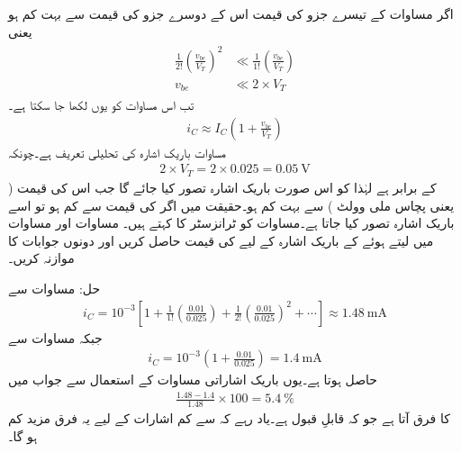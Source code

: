 اگر مساوات   کے تیسرے جزو کی قیمت اس کے دوسرے جزو کی قیمت سے بہت کم ہو یعنی
\begin{gather} \label{مساوات_ٹرانزسٹر_باریک_اشارہ_کی_تحلیلی_تعریف}
\begin{aligned}
\frac{1}{2!} \left(\frac{v_{be}}{V_T} \right )^2 & \ll \frac{1}{1!} \left(\frac{v_{be}}{V_T} \right )\\
v_{be}  & \ll 2 \times V_T
\end{aligned}
\end{gather}
تب اس مساوات کو یوں لکھا جا سکتا ہے۔
\begin{align} \label{مساوات_ٹرانزسٹر_کی_باریک_اشاراتی_مساوات}
i_C \approx I_C \left (1+\frac{v_{be}}{V_T} \right )
\end{align}
مساوات   باریک اشارہ  کی تحلیلی تعریف ہے۔چونکہ
\begin{align*}
2 \times V_T = 2 \times 0.025 =\SI{0.05}{\volt}
\end{align*}
کے برابر ہے لہٰذا  کو اس صورت باریک اشارہ تصور کیا جائے گا جب اس کی قیمت    ( یعنی پچاس ملی وولٹ ) سے بہت کم ہو۔حقیقت میں اگر   کی قیمت  سے کم ہو تو اسے باریک اشارہ تصور کیا جاتا ہے۔مساوات   کو ٹرانزسٹر کا  کہتے ہیں۔
مساوات   اور مساوات   میں   لیتے ہوئے  کے باریک اشارہ کے لیے  کی قیمت حاصل کریں اور دونوں جوابات کا موازنہ کریں۔

حل:	مساوات   سے
\begin{align*}
i_C=10^{-3} \left [1+\frac{1}{1!} \left(\frac{0.01}{0.025}\right)  +\frac{1}{2!} \left( \frac{0.01}{0.025} \right)^2   +\cdots \right ] \approx \SI{1.48}{\milli \ampere}
\end{align*}
جبکہ مساوات   سے
\begin{align*}
i_C=10^{-3} \left(1+\frac{0.01}{0.025} \right )=\SI{1.4}{\milli \ampere}
\end{align*}
حاصل ہوتا ہے۔یوں باریک اشاراتی مساوات کے استعمال سے جواب میں
\begin{align*}
\frac{1.48-1.4}{1.48} \times 100=\SI{5.4}{\percent}
\end{align*}
کا فرق آتا ہے جو کہ قابلِ قبول ہے۔یاد رہے کہ  سے کم اشارات کے لیے یہ فرق مزید کم ہو گا۔

